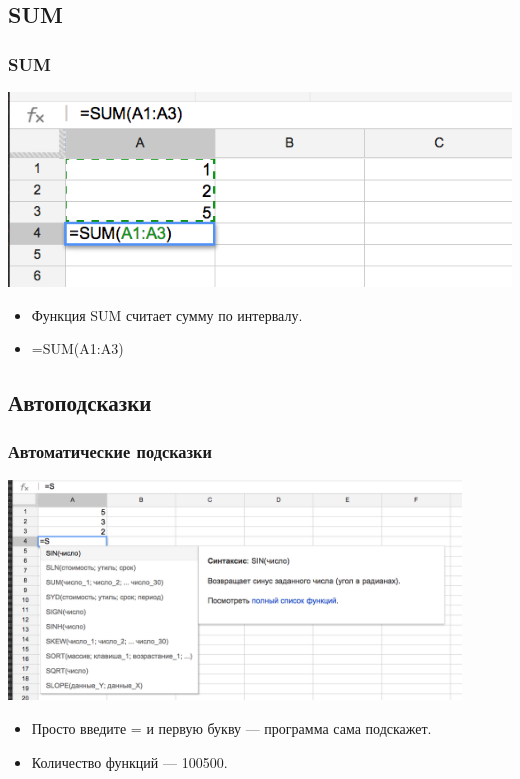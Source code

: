 \documentclass[compress,red]{beamer}
\begin{document}
\subsection{SUM}
\begin{frame}[fragile]
  \frametitle{SUM}
  \centerline{\includegraphics[width=1.0\textwidth]{images/05.png}}
  \begin{itemize}
      \item Функция SUM считает сумму по интервалу.
      \item =SUM(A1:A3)
  \end{itemize}
\end{frame}

\subsection{Автоподсказки}
\begin{frame}[fragile]
  \frametitle{Автоматические подсказки}
  \centerline{\includegraphics[width=0.9\textwidth]{images/09.png}}
  \begin{itemize}
      \item Просто введите = и первую букву --- программа сама подскажет.
      \item Количество функций --- 100500.
  \end{itemize}
\end{frame}
\end{document}
